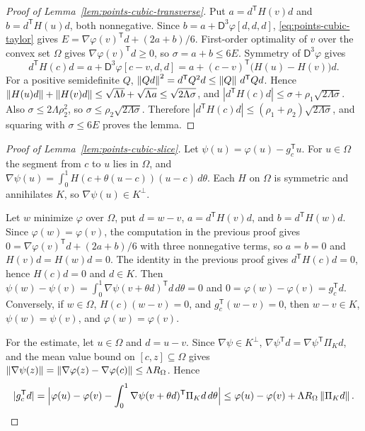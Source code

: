 \begin{proof}[Proof of Lemma~\ref{lem:points-cubic-transverse}]
Put $a=d^{\mathsf T}H(v)d$ and $b=d^{\mathsf T}H(u)d$, both nonnegative.
Since $b=a+\mathsf D^3\varphi[d,d,d]$, \eqref{eq:points-cubic-taylor} gives
$E=\nabla\varphi(v)^{\mathsf T}d+(2a+b)/6$. First-order optimality of $v$
over the convex set $\Omega$ gives $\nabla\varphi(v)^{\mathsf T}d\ge0$, so
$\sigma=a+b\le6E$. Symmetry of $\mathsf D^3\varphi$ gives
\[
 d^{\mathsf T}H(c)d=a+\mathsf D^3\varphi[c-v,d,d]
 =a+(c-v)^{\mathsf T}\bigl(H(u)-H(v)\bigr)d .
\]
For a positive semidefinite $Q$, $\left\lVert Qd\right\rVert^2=d^{\mathsf T}Q^2d\le
\left\lVert Q\right\rVert\,d^{\mathsf T}Qd$. Hence $\left\lVert H(u)d\right\rVert+\left\lVert H(v)d\right\rVert\le
\sqrt{\Lambda b}+\sqrt{\Lambda a}\le\sqrt{2\Lambda\sigma}$, and
$|d^{\mathsf T}H(c)d|\le\sigma+\rho_1\sqrt{2\Lambda\sigma}$. Also
$\sigma\le2\Lambda\rho_2^2$, so $\sigma\le\rho_2\sqrt{2\Lambda\sigma}$.
Therefore $|d^{\mathsf T}H(c)d|\le(\rho_1+\rho_2)\sqrt{2\Lambda\sigma}$, and
squaring with $\sigma\le6E$ proves the lemma.
\end{proof}

\begin{proof}[Proof of Lemma~\ref{lem:points-cubic-slice}]
Let $\psi(u)=\varphi(u)-g_c^{\mathsf T}u$. For $u\in\Omega$ the segment from
$c$ to $u$ lies in $\Omega$, and
$\nabla\psi(u)=\int_0^1H(c+\theta(u-c))(u-c)\,d\theta$. Each $H$ on $\Omega$
is symmetric and annihilates $K$, so $\nabla\psi(u)\in K^\perp$.

Let $w$ minimize $\varphi$ over $\Omega$, put $d=w-v$, $a=d^{\mathsf
T}H(v)d$, and $b=d^{\mathsf T}H(w)d$. Since $\varphi(w)=\varphi(v)$, the
computation in the previous proof gives
$0=\nabla\varphi(v)^{\mathsf T}d+(2a+b)/6$ with three nonnegative terms, so
$a=b=0$ and $H(v)d=H(w)d=0$. The identity in the previous proof gives
$d^{\mathsf T}H(c)d=0$, hence $H(c)d=0$ and $d\in K$. Then
$\psi(w)-\psi(v)=\int_0^1\nabla\psi(v+\theta d)^{\mathsf T}d\,d\theta=0$
and $0=\varphi(w)-\varphi(v)=g_c^{\mathsf T}d$. Conversely, if $w\in\Omega$,
$H(c)(w-v)=0$, and $g_c^{\mathsf T}(w-v)=0$, then $w-v\in K$,
$\psi(w)=\psi(v)$, and $\varphi(w)=\varphi(v)$.

For the estimate, let $u\in\Omega$ and $d=u-v$. Since
$\nabla\psi\in K^\perp$, $\nabla\psi^{\mathsf T}d=\nabla\psi^{\mathsf
T}\Pi_Kd$, and the mean value bound on $[c,z]\subseteq\Omega$ gives
$\left\lVert\nabla\psi(z)\right\rVert=\left\lVert\nabla\varphi(z)-\nabla\varphi(c)\right\rVert\le\Lambda
R_\Omega$. Hence
\[
 |g_c^{\mathsf T}d|=\Bigl|\varphi(u)-\varphi(v)-\int_0^1\nabla\psi(v+\theta
 d)^{\mathsf T}\Pi_Kd\,d\theta\Bigr|\le\varphi(u)-\varphi(v)+\Lambda
 R_\Omega\left\lVert\Pi_Kd\right\rVert. \qedhere
\]
\end{proof}

